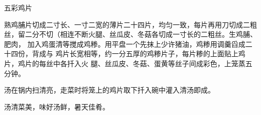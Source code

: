 \begin{recipe}{五彩鸡片}

\ingredients


\preparation

\step 熟鸡脯片切成二寸长、一寸二宽的薄片二十四片，均匀一致，每片再用刀切成二粗
丝，留二分不切（相连不断火腿、丝瓜皮、冬菇各切成一寸长的二粗丝。生鸡脯、肥肉，
加入鸡蛋清等搅成鸡糁。用平盘一个先抹上少许猪油，鸡糁用调羹舀成二十四份，背成与
鸡片长宽相等，约一分五厚的鸡糁片子，每片糁的上面贴上鸡片，鸡片的每丝中各扦入火
腿、丝瓜皮、冬菇、蛋黄等丝子间成彩色，上笼蒸五分钟。

汤在锅内扫清亮，走菜时将笼上的鸡片取下扦入碗中灌入清汤即成。

\features

汤清菜美，味好汤鲜，暑天佳肴。

\end{recipe}

